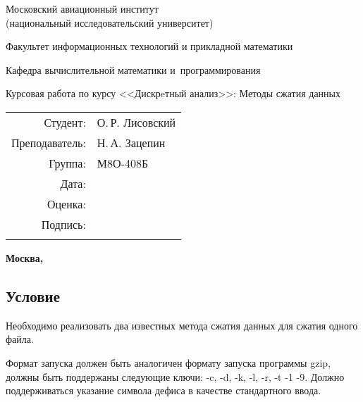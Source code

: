 \documentclass[12pt]{article}
\begin{document}
\begin{titlepage}
	\begin{center}
		\bfseries
		
		{\Large Московский авиационный институт\\ (национальный исследовательский университет)
			
		}
		
		\vspace{48pt}
		
		{\large Факультет информационных технологий и прикладной математики
		}
		
		\vspace{36pt}
		
		
		{\large Кафедра вычислительной математики и~программирования
			
		}
		
		
		\vspace{48pt}
		
		Курсовая работа по курсу <<Дискрeтный анализ>>: Методы сжатия данных
	\end{center}
	
	\vspace{72pt}
	
	\begin{flushright}
		\begin{tabular}{rl}
			Студент: & О.\,Р. Лисовский  \\
			Преподаватель: & Н.\,А. Зацепин \\
			Группа: & М8О-408Б \\
			Дата: & \\
			Оценка: & \\
			Подпись: & \\{\tiny {\tiny }}
		\end{tabular}
	\end{flushright}
	
	\vfill
	
	\begin{center}
		\bfseries
		Москва, \the\year
	\end{center}
\end{titlepage}

\pagebreak

\subsection*{Условие}

Необходимо реализовать два известных метода сжатия данных для сжатия одного файла. 

Формат запуска должен быть аналогичен формату запуска программы gzip, должны быть поддержаны следующие ключи: -c, -d, -k, -l, -r, -t -1 -9. Должно поддерживаться указание символа дефиса в качестве стандартного ввода.
\end{document}
